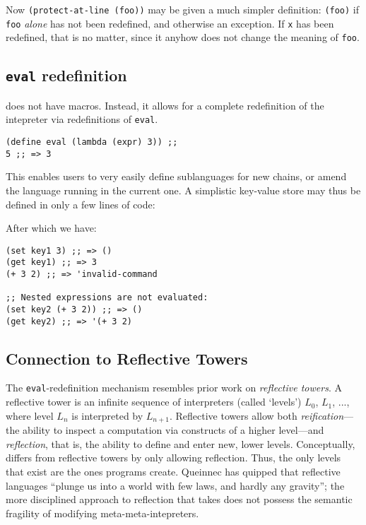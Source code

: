 Now \texttt{(protect-at-line (foo))} may be given a much simpler definition:
\texttt{(foo)} if \texttt{foo} \emph{alone} has not been redefined, and otherwise
an exception. If \texttt{x} has been redefined, that is no matter, since it
anyhow does not change the meaning of \texttt{foo}.


\subsection{\texttt{eval} redefinition}

\rad does not have macros. Instead, it allows for a complete redefinition of
the intepreter via redefinitions of \texttt{eval}.

\begin{verbatim}
(define eval (lambda (expr) 3)) ;;
5 ;; => 3
\end{verbatim}

This enables users to very easily define sublanguages for new chains, or amend
the language running in the current one. A simplistic key-value store may thus
be defined in only a few lines of code:



After which we have:

\begin{verbatim}
(set key1 3) ;; => ()
(get key1) ;; => 3
(+ 3 2) ;; => 'invalid-command

;; Nested expressions are not evaluated:
(set key2 (+ 3 2)) ;; => ()
(get key2) ;; => '(+ 3 2)
\end{verbatim}

\subsection{Connection to Reflective Towers}
\label{s:reflective-towers}

The \texttt{eval}-redefinition
mechanism resembles prior work on \emph{reflective towers}. A reflective
tower is an infinite sequence of interpreters (called `levels') $L_0$, $L_1$, ..., where
level $L_n$ is interpreted by $L_{n+1}$. Reflective towers allow both
\emph{reification}---the ability to inspect a computation via constructs of a
higher level---and \emph{reflection}, that is, the ability to define and enter new,
lower levels. Conceptually, \rad differs from reflective towers by only
allowing reflection. Thus, the only levels that exist are the ones programs
create. Queinnec has quipped that reflective languages ``plunge us into a world
with few laws, and hardly any gravity''\cite{Queinnec1994}; the more disciplined approach to
reflection that \rad takes does not possess the semantic fragility of modifying
meta-meta-intepreters.

